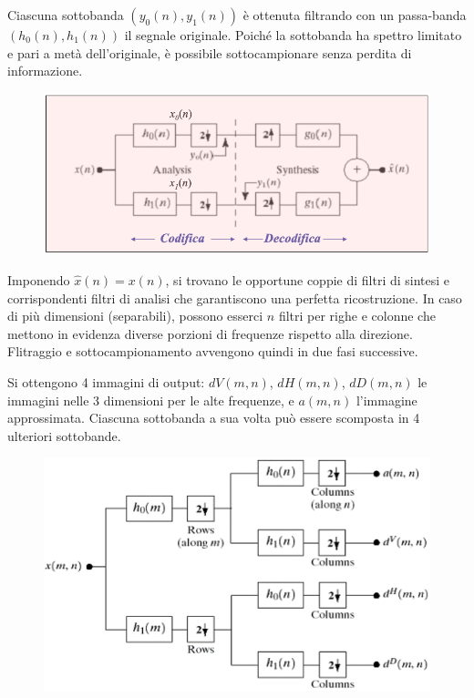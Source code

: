 Ciascuna sottobanda $(y_0(n), y_1(n))$ è ottenuta filtrando con un passa-banda $(h_0(n), h_1(n))$ il segnale originale. Poiché la sottobanda ha spettro limitato e pari a metà dell'originale, è possibile sottocampionare senza perdita di informazione. 

\begin{figure}[h]
	\centering
	\includegraphics[scale=0.3]{Lezioni/Immagini/sottobande}
\end{figure}

Imponendo $\hat{x}(n) = x(n)$, si trovano le opportune coppie di filtri di sintesi e corrispondenti filtri di analisi che garantiscono una perfetta ricostruzione. In caso di più dimensioni (separabili), possono esserci $n$ filtri per righe e colonne che mettono in evidenza diverse porzioni di frequenze rispetto alla direzione. Flitraggio e sottocampionamento avvengono quindi in due fasi successive.

Si ottengono 4 immagini di output: $dV(m, n)$, $dH(m, n)$, $dD(m, n)$ le immagini nelle 3 dimensioni per le alte frequenze, e $a(m, n)$ l'immagine approssimata. Ciascuna sottobanda a sua volta può essere scomposta in 4 ulteriori sottobande.

\begin{figure}[h]
	\centering
	\includegraphics[scale=0.5]{Lezioni/Immagini/sottobande2d}
\end{figure}

